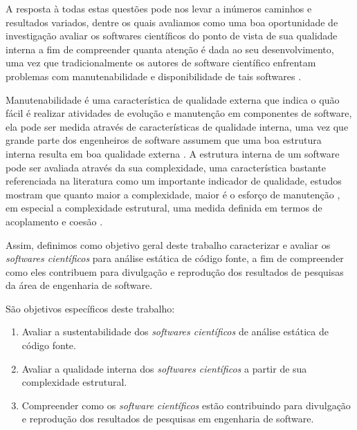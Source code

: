 A resposta à todas estas questões pode nos levar a inúmeros caminhos e
resultados variados, dentre os quais avaliamos como uma boa oportunidade de
investigação avaliar os softwares científicos do ponto de vista de sua
qualidade interna a fim de compreender quanta atenção é dada ao seu
desenvolvimento, uma vez que tradicionalmente os autores de software científico
enfrentam problemas com manutenabilidade e disponibilidade de tais softwares
\cite{Prlic2012}.

Manutenabilidade é uma característica de qualidade externa que indica o quão
fácil é realizar atividades de evolução e manutenção em componentes de
software, ela pode ser medida através de características de qualidade interna,
uma vez que grande parte dos engenheiros de software assumem que uma boa
estrutura interna resulta em boa qualidade externa \cite{Fenton2014}. A
estrutura interna de um software pode ser avaliada através da sua complexidade,
uma característica bastante referenciada na literatura como um importante
indicador de qualidade, estudos mostram que quanto maior a complexidade, maior
é o esforço de manutenção \cite{hashim1996software, Darcy2005}, em especial a
complexidade estrutural, uma medida definida em termos de acoplamento e coesão
\cite{Terceiro2012}.

Assim, definimos como objetivo geral deste trabalho caracterizar e avaliar os
{\it softwares científicos} para análise estática de código fonte, a fim de
compreender como eles contribuem para divulgação e reprodução dos resultados de
pesquisas da área de engenharia de software.

São objetivos específicos deste trabalho:

\begin{enumerate}
  \item Avaliar a sustentabilidade dos {\it softwares científicos} de análise estática de código fonte.
  \item Avaliar a qualidade interna dos {\it softwares científicos} a partir de sua complexidade estrutural.
  \item Compreender como os {\it software científicos} estão contribuindo para divulgação e reprodução dos resultados de pesquisas em engenharia de software.
\end{enumerate}

